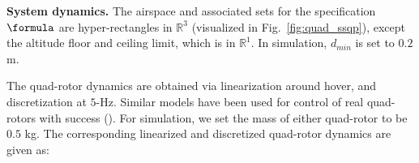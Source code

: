 \textbf{System dynamics.}
The airspace and associated sets for the specification $\formula$ are hyper-rectangles in $\mathbb{R}^3$ (visualized in Fig.~\ref{fig:quad_ssqp}), except the altitude floor and ceiling limit, which is in $\mathbb{R}^1$. In simulation, $d_{min}$ is set to $0.2$ m.



The quad-rotor dynamics are obtained via linearization around hover, and discretization at $5$-Hz. Similar models have been used for control of real quad-rotors with success (\cite{PantAMNDM15_Anytime}). For simulation, we set the mass of either quad-rotor to be $0.5$ kg. %
The corresponding linearized and discretized quad-rotor dynamics are given as:

